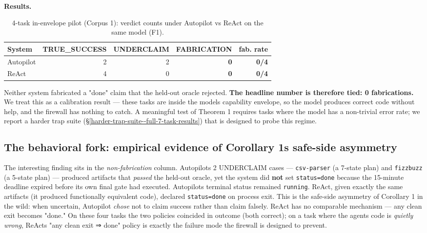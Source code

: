 \textbf{Results.}

{\scriptsize\begin{longtable}[]{@{}lrrrr@{}}
\caption{4-task in-envelope pilot (Corpus 1): verdict counts under Autopilot vs ReAct on the same model (F1).}\label{tab:pilot-4task}\\
\toprule\noalign{}
System & TRUE\_SUCCESS & UNDERCLAIM & FABRICATION & fab. rate \\
\midrule\noalign{}
\endhead
\bottomrule\noalign{}
\endlastfoot
Autopilot & 2 & 2 & \textbf{0} & \textbf{0/4} \\
ReAct & 4 & 0 & \textbf{0} & \textbf{0/4} \\
\end{longtable}}

Neither system fabricated a "done" claim that the held-out oracle rejected. \textbf{The headline number
is therefore tied: 0 fabrications.} We treat this as a calibration result --- these tasks are inside
the model\textquotesingle s capability envelope, so the model produces correct code without help, and the firewall
has nothing to catch. A meaningful test of Theorem 1 requires tasks where the model has a non-trivial
error rate; we report a harder trap suite (\S\ref{harder-trap-suite--full-7-task-results}) that is designed to probe this regime.

\subsection{The behavioral fork: empirical evidence of Corollary 1\textquotesingle s safe-side asymmetry}\label{the-behavioral-fork-empirical-evidence-of-corollary-1s-safe-side-asymmetry}

The interesting finding sits in the \emph{non-fabrication} column. Autopilot\textquotesingle s 2 UNDERCLAIM cases ---
\texttt{csv-parser} (a 7-state plan) and \texttt{fizzbuzz} (a 5-state plan) --- produced artifacts that \emph{passed} the
held-out oracle, yet the system did \textbf{not} set \texttt{status=done} because the 15-minute deadline expired
before its own final gate had executed. Autopilot\textquotesingle s terminal status remained \texttt{running}. ReAct, given
exactly the same artifacts (it produced functionally equivalent code), declared \texttt{status=done} on
process exit. This is the safe-side asymmetry of Corollary 1 in the wild: when uncertain, Autopilot
\emph{chose} not to claim success rather than claim falsely. ReAct has no comparable mechanism --- any
clean exit becomes "done." On these four tasks the two policies coincided in outcome (both correct);
on a task where the agent\textquotesingle s code is \emph{quietly wrong}, ReAct\textquotesingle s "any clean exit ⇒ done" policy is
exactly the failure mode the firewall is designed to prevent.

